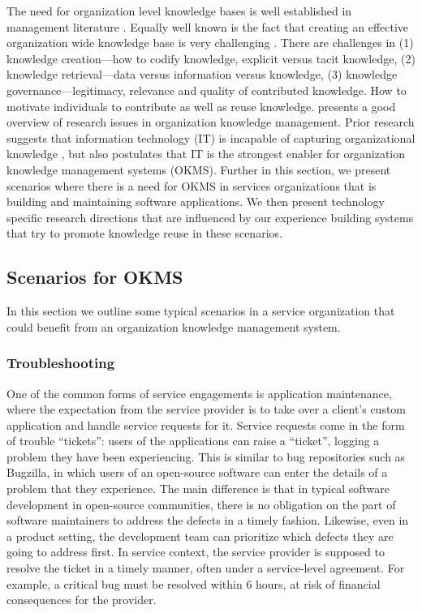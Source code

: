 The need for organization level knowledge bases is well established in management literature \cite{}. Equally well known is the fact that creating an effective organization wide knowledge base is very challenging \cite{}. There are challenges in (1) knowledge creation---how to codify knowledge, explicit versus tacit knowledge, (2) knowledge retrieval---data versus information versus knowledge, (3) knowledge governance---legitimacy, relevance and quality of contributed knowledge. How to motivate individuals to contribute as well as reuse knowledge. \cite{Alavi:2001} presents a good overview of research issues in organization knowledge management. Prior research suggests that information technology (IT) is incapable of capturing organizational knowledge \cite{malhotra2004knowledge,Davenport:1997}, but also postulates that IT is the strongest enabler for organization knowledge management systems (OKMS). Further in this section, we present scenarios where there is a need for OKMS in services organizations that is building and maintaining software applications. We then present technology specific research directions that are influenced by our experience building systems that try to promote knowledge reuse in these scenarios. 

\subsection{Scenarios for OKMS}

In this section we outline some typical scenarios in a service organization that could benefit from an organization knowledge management system. 

\subsubsection{Troubleshooting}

One of the common forms of service engagements is application maintenance, where the expectation from the service provider is to take over a client's custom application and handle service requests for it.  Service requests come in the form of trouble ``tickets'': users of the applications can raise a ``ticket'', logging a problem they have been experiencing. This is similar to bug repositories such as Bugzilla, in which users of an open-source software can enter the details of a problem that they experience.  The main difference is that in typical software development in open-source communities, there is no obligation on the part of software maintainers to address the defects in a timely fashion. Likewise, even in a product setting, the development team can prioritize which defects they are going to address first.  In service context, the service provider is supposed to resolve the ticket in a timely manner, often under a service-level agreement. For example, a critical bug must be resolved within 6 hours, at risk of financial consequences for the provider. 


